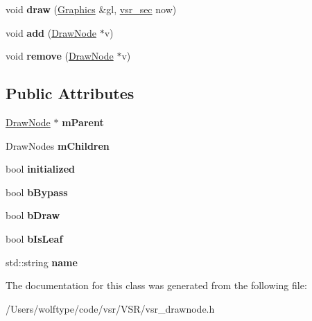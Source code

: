 \begin{DoxyCompactItemize}
\item 
\hypertarget{classvsr_1_1_draw_node_a4920501b4d217249db65e5c3f8acae27}{void {\bfseries draw} (\hyperlink{classvsr_1_1_graphics}{Graphics} \&gl, \hyperlink{classvsr_1_1vsr__sec}{vsr\-\_\-sec} now)}\label{classvsr_1_1_draw_node_a4920501b4d217249db65e5c3f8acae27}

\item 
\hypertarget{classvsr_1_1_draw_node_add4d584649e0f4d8b47c3579cdd04bf4}{void {\bfseries add} (\hyperlink{classvsr_1_1_draw_node}{Draw\-Node} $\ast$v)}\label{classvsr_1_1_draw_node_add4d584649e0f4d8b47c3579cdd04bf4}

\item 
\hypertarget{classvsr_1_1_draw_node_ad8c593f0b79e3a8a874bb37b5e9d0d55}{void {\bfseries remove} (\hyperlink{classvsr_1_1_draw_node}{Draw\-Node} $\ast$v)}\label{classvsr_1_1_draw_node_ad8c593f0b79e3a8a874bb37b5e9d0d55}

\end{DoxyCompactItemize}
\subsection*{Public Attributes}
\begin{DoxyCompactItemize}
\item 
\hypertarget{classvsr_1_1_draw_node_a5df9568995f1bbf979c1cc93ffe5c973}{\hyperlink{classvsr_1_1_draw_node}{Draw\-Node} $\ast$ {\bfseries m\-Parent}}\label{classvsr_1_1_draw_node_a5df9568995f1bbf979c1cc93ffe5c973}

\item 
\hypertarget{classvsr_1_1_draw_node_aa1f73684bb314772346eef64393301cf}{Draw\-Nodes {\bfseries m\-Children}}\label{classvsr_1_1_draw_node_aa1f73684bb314772346eef64393301cf}

\item 
\hypertarget{classvsr_1_1_draw_node_a510cb6f414b44211184ba9556fa91474}{bool {\bfseries initialized}}\label{classvsr_1_1_draw_node_a510cb6f414b44211184ba9556fa91474}

\item 
\hypertarget{classvsr_1_1_draw_node_a9169d41b1c88b3d986a46fb85d7791e0}{bool {\bfseries b\-Bypass}}\label{classvsr_1_1_draw_node_a9169d41b1c88b3d986a46fb85d7791e0}

\item 
\hypertarget{classvsr_1_1_draw_node_af2028a9c7d953983380941e2e1013ae8}{bool {\bfseries b\-Draw}}\label{classvsr_1_1_draw_node_af2028a9c7d953983380941e2e1013ae8}

\item 
\hypertarget{classvsr_1_1_draw_node_a3ea83ff76bb38c31d5380eadff9c3b16}{bool {\bfseries b\-Is\-Leaf}}\label{classvsr_1_1_draw_node_a3ea83ff76bb38c31d5380eadff9c3b16}

\item 
\hypertarget{classvsr_1_1_draw_node_ac5b154afa163d63ebbd841cb853d27e4}{std\-::string {\bfseries name}}\label{classvsr_1_1_draw_node_ac5b154afa163d63ebbd841cb853d27e4}

\end{DoxyCompactItemize}


The documentation for this class was generated from the following file\-:\begin{DoxyCompactItemize}
\item 
/\-Users/wolftype/code/vsr/\-V\-S\-R/vsr\-\_\-drawnode.\-h\end{DoxyCompactItemize}
